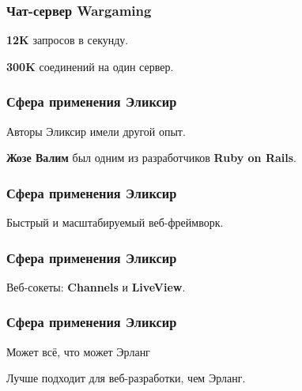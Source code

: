 \documentclass[10pt]{beamer}
\begin{document}
\begin{frame}
  \frametitle{Чат-сервер Wargaming}
  \textbf{12K} запросов в секунду.
  \par \bigskip
  \textbf{300K} соединений на один сервер.
\end{frame}

\begin{frame}
  \frametitle{Сфера применения Эликсир}
  Авторы Эликсир имели другой опыт.
  \par \bigskip
  \textbf{Жозе Валим} был одним из разработчиков \textbf{Ruby on Rails}.
\end{frame}

\begin{frame}
  \frametitle{Сфера применения Эликсир}
  Быстрый и масштабируемый веб-фреймворк.
\end{frame}

\begin{frame}
  \frametitle{Сфера применения Эликсир}
  Веб-сокеты: \textbf{Channels} и \textbf{LiveView}.
\end{frame}

\begin{frame}
  \frametitle{Сфера применения Эликсир}
  Может всё, что может Эрланг
  \par \bigskip
  Лучше подходит для веб-разработки, чем Эрланг.
\end{frame}
\end{document}
